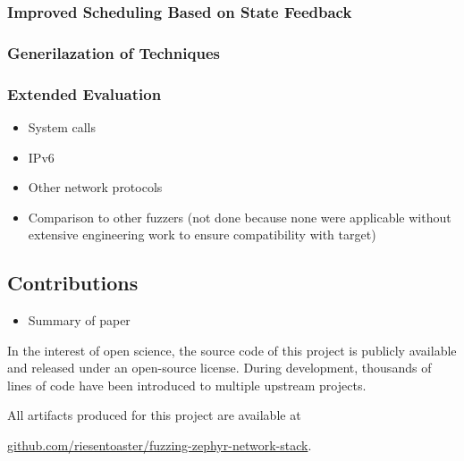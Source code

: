 \documentclass{article}
\begin{document}
\begin{multicols}{2}
  \subsubsection{Improved Scheduling Based on State Feedback}
  \subsubsection{Generilazation of Techniques}
  \subsubsection{Extended Evaluation}
  \begin{itemize}
    \item System calls
    \item IPv6
    \item Other network protocols
    \item Comparison to other fuzzers (not done because none were applicable without extensive engineering work to ensure compatibility with target)
  \end{itemize}

  \subsection{Contributions}
  \begin{itemize}
    \item Summary of paper
  \end{itemize}

\end{multicols}
\vspace{30px}
\begin{center}
  \begin{minipage}{0.65\textwidth}
    \centering
    In the interest of open science, the source code of this project is publicly available and released under an open-source license. During development, thousands of lines of code have been introduced to multiple upstream projects.

    All artifacts produced for this project are available at

    \vspace{8px}

    \href{https://github.com/riesentoaster/fuzzing-zephyr-network-stack}{github.com/riesentoaster/fuzzing-zephyr-network-stack}.
  \end{minipage}
\end{center}

\vspace{50px}

\end{document}
